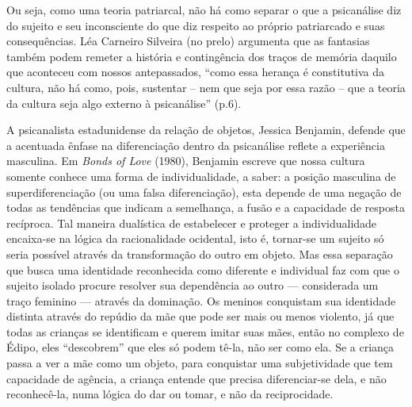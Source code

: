 Ou seja, como uma teoria patriarcal, não há como separar o que a
psicanálise diz do sujeito e seu inconsciente do que diz respeito ao
próprio patriarcado e suas consequências. Léa Carneiro Silveira (no
prelo) argumenta que as fantasias também podem remeter a história e
contingência dos traços de memória daquilo que aconteceu com nossos
antepassados, ``como essa herança é constitutiva da cultura, não há como,
pois, sustentar -- nem que seja por essa razão -- que a teoria da
cultura seja algo externo à psicanálise'' (p.6).

A psicanalista estadunidense da relação de objetos, Jessica Benjamin,
defende que a acentuada ênfase na diferenciação dentro da psicanálise
reflete a experiência masculina. Em \emph{Bonds of Love} (1980),
Benjamin escreve que nossa cultura somente conhece uma forma de
individualidade, a saber: a posição masculina de superdiferenciação (ou
uma falsa diferenciação), esta depende de uma negação de todas as
tendências que indicam a semelhança, a fusão e a capacidade de resposta
recíproca. Tal maneira dualística de estabelecer e proteger a
individualidade encaixa-se na lógica da racionalidade ocidental, isto é,
tornar-se um sujeito só seria possível através da transformação do outro
em objeto. Mas essa separação que busca uma identidade reconhecida como
diferente e individual faz com que o sujeito isolado procure resolver
sua dependência ao outro --- considerada um traço feminino --- através
da dominação. Os meninos conquistam sua identidade distinta através do
repúdio da mãe que pode ser mais ou menos violento, já que todas as
crianças se identificam e querem imitar suas mães, então no complexo de
Édipo, eles ``descobrem'' que eles só podem tê-la, não ser como ela. Se
a criança passa a ver a mãe como um objeto, para conquistar uma
subjetividade que tem capacidade de agência, a criança entende que
precisa diferenciar-se dela, e não reconhecê-la, numa lógica do dar ou
tomar, e não da reciprocidade.

